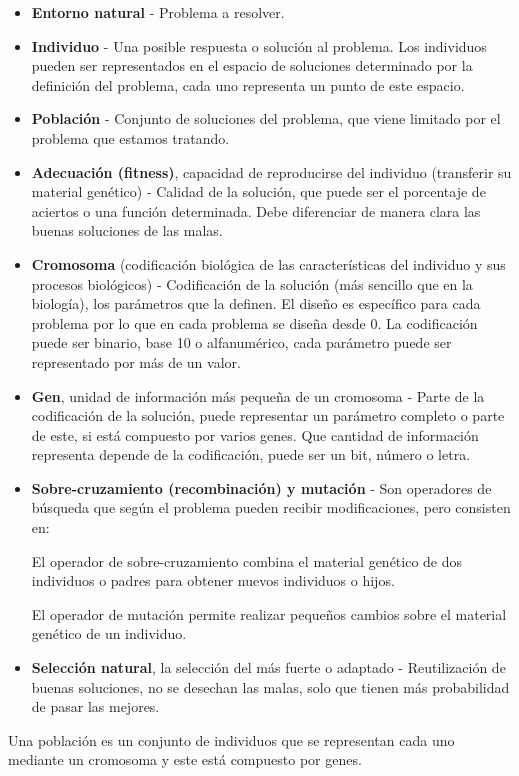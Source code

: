 \documentclass[12pt, twoside, openright]{report} %
\begin{document}
\begin{itemize}
	\item \textbf{Entorno natural} - Problema a resolver.
	\item \textbf{Individuo} - Una posible respuesta o solución al problema. Los individuos pueden ser representados en el espacio de soluciones determinado por la definición del problema, cada uno representa un punto de este espacio.
	\item \textbf{Población} - Conjunto de soluciones del problema, que viene limitado por el problema que estamos tratando.
	\item \textbf{Adecuación (fitness)}, capacidad de reproducirse del individuo (transferir su material genético) - Calidad de la solución, que puede ser el porcentaje de aciertos o una función determinada. Debe diferenciar de manera clara las buenas soluciones de las malas.
	\item \textbf{Cromosoma} (codificación biológica de las características del individuo y sus procesos biológicos) - Codificación de la solución (más sencillo que en la biología), los parámetros que la definen. El diseño es específico para cada problema por lo que en cada problema se diseña desde 0. La codificación puede ser binario, base 10 o alfanumérico, cada parámetro puede ser representado por más de un valor.
	\item \textbf{Gen}, unidad de información más pequeña de un cromosoma - Parte de la codificación de la solución, puede representar un parámetro completo o parte de este, si está compuesto por varios genes. Que cantidad de información representa depende de la codificación, puede ser un bit, número o letra.
	\item \textbf{Sobre-cruzamiento (recombinación) y mutación} - Son operadores de búsqueda que según el problema pueden recibir modificaciones, pero consisten en:
	      
	      El operador de sobre-cruzamiento combina el material genético de dos individuos o padres para obtener nuevos individuos o hijos.
	      
	      El operador de mutación permite realizar pequeños cambios sobre el material genético de un individuo.
	\item \textbf{Selección natural}, la selección del más fuerte o adaptado - Reutilización de buenas soluciones, no se desechan las malas, solo que tienen más probabilidad de pasar las mejores.
\end{itemize}

Una población es un conjunto de individuos que se representan cada uno mediante un cromosoma y este está compuesto por genes.
\end{document}
